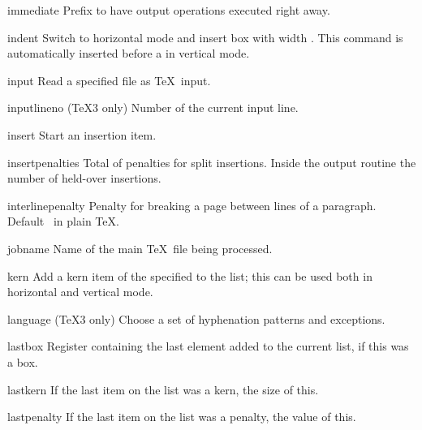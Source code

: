 \item immediate 
      Prefix to have output operations executed right away.

\item indent
      Switch to horizontal mode and insert box with width .
      This command is automatically inserted before a
       in vertical mode.

\item input
      Read a specified file as \TeX\ input. 

\item inputlineno
      (\TeX3 only) 
      Number of the current input line.

\item insert\lb{}\rb
      Start an insertion item.

\item insertpenalties
      Total of penalties for split insertions.
      Inside the output routine the number of held-over insertions.

\item interlinepenalty
      Penalty for breaking a page between lines of a paragraph. 
      Default~ in plain \TeX.

\item jobname
      Name of the main \TeX\ file being processed.

\item kern
      Add a kern item of the specified
       to the list;
      this can be used both in horizontal and vertical mode.

\item language
      (\TeX3 only)
      Choose a set of hyphenation patterns and exceptions.

\item lastbox
      Register containing the last element  added to the current list, 
      if this was a box.

\item lastkern
      If the last item on the list was a kern, the size of this.

\item lastpenalty
      If the last item on the list was a penalty, the value of this.

